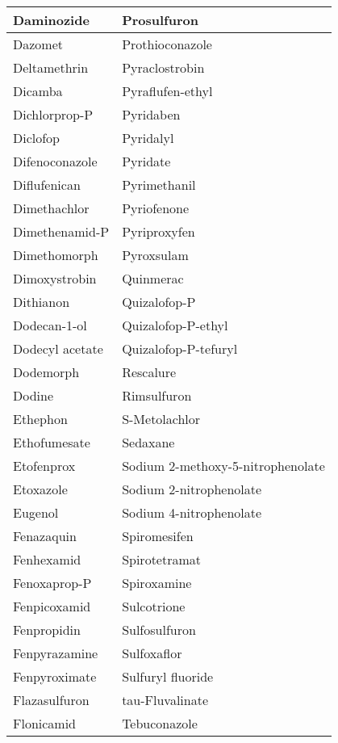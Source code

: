 \begin{small}
\begin{longtable}{|l|l|}
        Daminozide & Prosulfuron \\ \hline
        Dazomet & Prothioconazole \\ \hline
        Deltamethrin & Pyraclostrobin \\ \hline
        Dicamba & Pyraflufen-ethyl \\ \hline
        Dichlorprop-P & Pyridaben \\ \hline
        Diclofop & Pyridalyl \\ \hline
        Difenoconazole & Pyridate \\ \hline
        Diflufenican & Pyrimethanil \\ \hline
        Dimethachlor & Pyriofenone \\ \hline
        Dimethenamid-P & Pyriproxyfen \\ \hline
        Dimethomorph & Pyroxsulam \\ \hline
        Dimoxystrobin & Quinmerac \\ \hline
        Dithianon & Quizalofop-P \\ \hline
        Dodecan-1-ol & Quizalofop-P-ethyl \\ \hline
        Dodecyl acetate & Quizalofop-P-tefuryl \\ \hline
        Dodemorph & Rescalure \\ \hline
        Dodine & Rimsulfuron \\ \hline
        Ethephon & S-Metolachlor \\ \hline
        Ethofumesate & Sedaxane \\ \hline
        Etofenprox & Sodium 2-methoxy-5-nitrophenolate \\ \hline
        Etoxazole & Sodium 2-nitrophenolate \\ \hline
        Eugenol & Sodium 4-nitrophenolate \\ \hline
        Fenazaquin & Spiromesifen \\ \hline
        Fenhexamid & Spirotetramat \\ \hline
        Fenoxaprop-P & Spiroxamine \\ \hline
        Fenpicoxamid & Sulcotrione \\ \hline
        Fenpropidin & Sulfosulfuron \\ \hline
        Fenpyrazamine & Sulfoxaflor \\ \hline
        Fenpyroximate & Sulfuryl fluoride \\ \hline
        Flazasulfuron & tau-Fluvalinate \\ \hline
        Flonicamid & Tebuconazole \\ \hline

\end{longtable}
\end{small}

